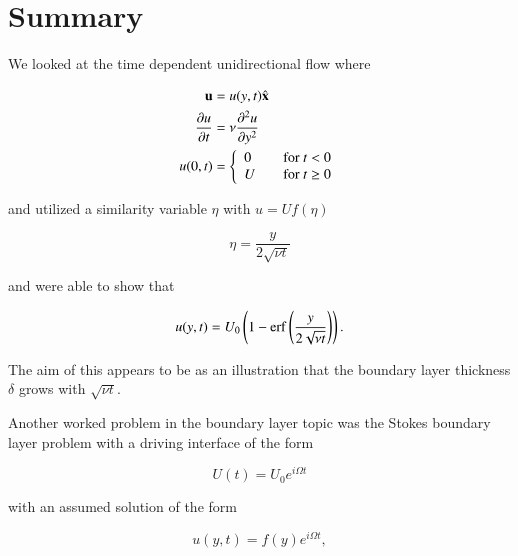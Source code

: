 \section{Summary}

We looked at the time dependent unidirectional flow where

\begin{align}\label{eqn:continuumFluidsReview:2230}
\Bu &= u(y, t) \xcap \\
\PD{t}{u} &= \nu \PDSq{y}{u} \\
u(0, t) &=
\left\{
\begin{array}{l l}
0 & \quad \mbox{for $t < 0$} \\
U & \quad \mbox{for $t \ge 0$}
\end{array}
\right.
\end{align}

and utilized a similarity variable $\eta$ with $u = U f(\eta)$

\begin{equation}\label{eqn:continuumFluidsReview:2250}
\eta = \frac{y}{2 \sqrt{\nu t}}
\end{equation}

and were able to show that

\begin{equation}\label{eqn:continuumFluidsReview:2270}
u(y, t) = U_0 \left(1 - \erf\left(\frac{y}{2 \sqrt{\nu t}}\right) \right).
\end{equation}

The aim of this appears to be as an illustration that the boundary layer thickness $\delta$ grows with $\sqrt{\nu t}$.



Another worked problem in the boundary layer topic was the Stokes boundary layer problem with a driving interface of the form

\begin{equation}\label{eqn:continuumFluidsReview:2370}
U(t) = U_0 e^{i \Omega t}
\end{equation}

with an assumed solution of the form

\begin{equation}\label{eqn:continuumFluidsReview:2390}
u(y, t) = f(y) e^{i \Omega t},
\end{equation}

